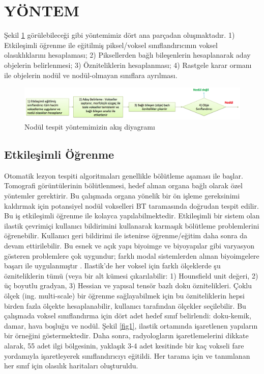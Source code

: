 \documentclass[conference]{IEEEtran}
\begin{document}
\section{YÖNTEM}
Şekil \ref{figflow} görülebileceği gibi yöntemimiz dört ana parçadan oluşmaktadır. 1) Etkileşimli öğrenme ile eğitilmiş piksel/voksel sınıflandırıcının voksel olasıklıklarını hesaplaması; 2) Piksellerden bağlı bileşenlerin hesaplanarak aday objelerin belirlenmesi; 3) Özniteliklerin hesaplanması; 4) Rastgele karar ormanı ile objelerin nodül ve nodül-olmayan sınıflara ayrılması.

\begin{figure}[tb!]
\centering
\includegraphics[width=\textwidth]{figs/flow.png}
\caption{Nodül tespit yöntemimizin akış diyagramı}
\label{figflow}
\end{figure}

\subsection{Etkileşimli Öğrenme}\label{ilastik}
Otomatik lezyon tespiti algoritmaları genellikle bölütleme aşaması ile başlar. Tomografi görüntülerinin bölütlenmesi, hedef alınan organa bağlı olarak özel yöntemler gerektirir. Bu çalışmada organa yönelik bir ön işleme gereksinimi kaldırmak için potansiyel nodül vokselleri BT taramasında doğrudan tespit edilir. Bu iş etkileşimli öğrenme ile kolayca yapılabilmektedir. Etkileşimli bir sistem olan ilastik \cite{sommer2011} çevrimiçi kullanıcı bildirimini kullanarak karmaşık bölütleme problemlerini öğrenebilir. Kullanıcı geri bildirimi ile istenirse öğrenme/eğitim daha sonra da devam ettirilebilir. Bu esnek ve açık yapı biyoimge ve biyoyapılar gibi varyasyon gösteren problemlere çok uygundur; farklı modal sistemlerden alınan biyoimgelere başarı ile uygulanmıştır \cite{tek2014}. 
Ilastik'de her voksel için farklı ölçeklerde şu özniteliklerin tümü (veya bir alt kümesi çıkarılabilir: 1) Hounsfield unit değeri, 2) üç boyutlu gradyan, 3) Hessian ve yapısal tensör bazlı doku öznitelikleri. Çoklu ölçek (ing. multi-scale) bir öğrenme sağlayabilmek için bu özniteliklerin hepsi birden fazla ölçekte hesaplanabilir, kullanıcı tarafından ölçekler seçilebilir. Bu çalışmada voksel sınıflandırma için dört adet hedef sınıf belirlendi: doku-kemik, damar, hava boşluğu ve nodül. Şekil \ref{fig1}, ilastik ortamında işaretlenen yapıların bir örneğini göstermektedir. Daha sonra, radyologların işaretlemelerini dikkate alarak, 55 adet ilgi bölgesinin, yaklaşık 3-4 adet kesitinde bir kaç vokseli fare yordamıyla işaretleyerek sınıflandırıcıyı eğitildi. Her tarama için ve tanımlanan her sınıf için olasılık haritaları oluşturuldu.
\end{document}
